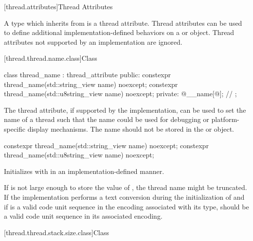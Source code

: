 \documentclass{wg21}
\begin{document}
\begin{addedblock}

[thread.attributes]{Thread Attributes}

A type which inherits from  is a thread attribute.
Thread attributes can be used to define additional implementation-defined behaviors on a  or  object.
Thread attributes not supported by an implementation are ignored.


[thread.thread.name.class]{Class }

\begin{codeblock}
class thread_name : thread_attribute {
public:
    constexpr thread_name(std::string_view name) noexcept;
    constexpr thread_name(std::u8string_view name) noexcept;
private:
    @\impdefnc@ __name[@\impdefnc@]; // \expos
};
\end{codeblock}

\recommended

The  thread attribute, if supported by the implementation, can be used
to set the name of a thread such that the name could be used for debugging or platform-specific display mechanisms.
The name should not be stored in the  or  object.

\begin{itemdecl}
constexpr thread_name(std::string_view name) noexcept;
constexpr thread_name(std::u8string_view name) noexcept;
\end{itemdecl}

\begin{itemdescr}
\effects Initializes  with  in an implementation-defined manner.

\recommended If  is not large enough to store the value of ,
             the thread name might be truncated. If the implementation performs a text conversion
             during the initialization of  and if  is a valid code unit sequence
             in the encoding associated with its type,  should be a valid code unit sequence in its
             associated encoding.
\end{itemdescr}

[thread.thread.stack.size.class]{Class }


\end{addedblock}
\end{document}
